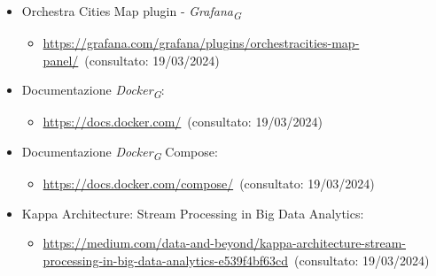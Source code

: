 \begin{itemize}
\begin{itemize}
    \end{itemize}
    \item  Orchestra Cities Map plugin - \textit{Grafana}\textsubscript{\textit{G}} 
    \begin{itemize}
        \item \url{https://grafana.com/grafana/plugins/orchestracities-map-panel/}~(consultato: 19/03/2024)
    \end{itemize}
    \item Documentazione \textit{Docker}\textsubscript{\textit{G}}: 
    \begin{itemize}
        \item \url{https://docs.docker.com/}~(consultato: 19/03/2024)
    \end{itemize}
    \item Documentazione \textit{Docker}\textsubscript{\textit{G}} Compose: 
    \begin{itemize}
        \item \url{https://docs.docker.com/compose/}~(consultato: 19/03/2024)
    \end{itemize}
    \item Kappa Architecture: Stream Processing in Big Data Analytics: 
    \begin{itemize}
        \item \url{https://medium.com/data-and-beyond/kappa-architecture-stream-processing-in-big-data-analytics-e539f4bf63cd}~(consultato: 19/03/2024)
    \end{itemize}
\end{itemize}
